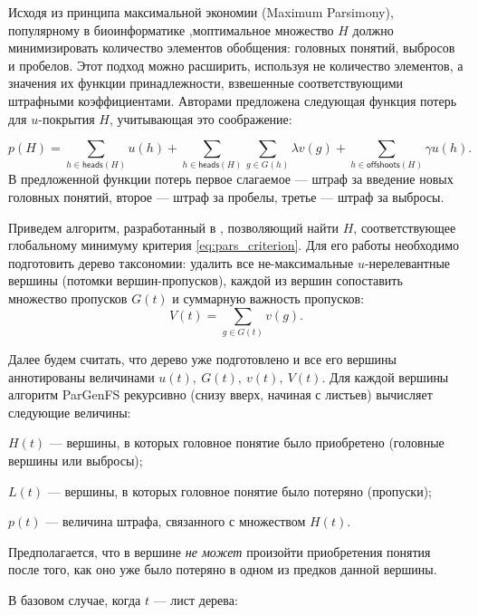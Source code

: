 \documentclass[12pt]{article}
\newenvironment{itemize*}%
{\begin{itemize}%
	\setlength{\itemsep}{0pt}%
	\setlength{\parskip}{0pt}}%
{\end{itemize}}
\begin{document}
Исходя из принципа максимальной экономии (Maximum Parsimony), популярному в биоинформатике \cite{robinson2011introduction},моптимальное множество $H$ должно минимизировать количество элементов обобщения: головных понятий, выбросов и пробелов. Этот подход можно расширить, используя не количество элементов, а значения их функции принадлежности, взвешенные соответствующими штрафными коэффициентами. Авторами \cite{mirkin2018preprint} предложена следующая функция потерь для $u$-покрытия $H$, учитывающая это соображение:

\begin{equation}
	p(H)=\sum_{h\in \textsf{heads}(H)}u(h) + \sum_{h\in \textsf{heads}(H)}\sum_{g\in G(h)}\lambda v(g) + \sum_{h\in \textsf{offshoots}(H)}\gamma u(h).
	\label{eq:pars_criterion}
\end{equation}
В предложенной функции потерь первое слагаемое --- штраф за введение новых головных понятий, второе --- штраф за пробелы, третье --- штраф за выбросы.

Приведем алгоритм, разработанный в \cite{mirkin2018preprint}, позволяющий найти $H$, соответствующее глобальному минимуму критерия \eqref{eq:pars_criterion}. Для его работы необходимо подготовить дерево таксономии: удалить все не-максимальные $u$-нерелевантные вершины (потомки вершин-пропусков), каждой из вершин сопоставить множество пропусков $G(t)$ и суммарную важность пропусков:
\begin{equation}
	V(t)=\sum_{g\in G(t)}v(g).
	\label{eq:sum_gap_importance}
\end{equation}

Далее будем считать, что дерево уже подготовлено и все его вершины аннотированы величинами $u(t), \ G(t), \ v(t), \ V(t)$. Для каждой вершины алгоритм ParGenFS рекурсивно (снизу вверх, начиная с листьев) вычисляет следующие величины:
\begin{itemize*}
	\item $H(t)$ --- вершины, в которых головное понятие было приобретено (головные вершины или выбросы);
	\item $L(t)$ --- вершины, в которых головное понятие было потеряно (пропуски);
	\item $p(t)$ --- величина штрафа, связанного с множеством $H(t)$.
\end{itemize*}
Предполагается, что в вершине \emph{не может} произойти приобретения понятия после того, как оно уже было потеряно в одном из предков данной вершины.

В базовом случае, когда $t$ --- лист дерева:
\end{document}
